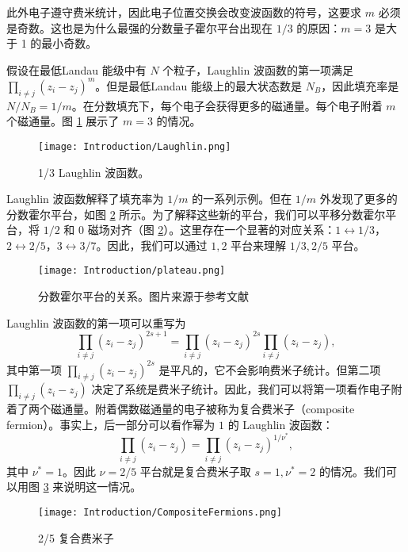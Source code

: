 此外电子遵守费米统计，因此电子位置交换会改变波函数的符号，这要求 $m$ 必须是奇数。这也是为什么最强的分数量子霍尔平台出现在 $1/3$ 的原因：$m=3$ 是大于 1 的最小奇数。

假设在最低Landau 能级中有 $N$ 个粒子，Laughlin 波函数的第一项满足 $\prod_{i \neq j}\left(z_i-z_j\right)^m$。但是最低Landau 能级上的最大状态数是 $N_B$，因此填充率是 $N/N_B=1/m$。在分数填充下，每个电子会获得更多的磁通量。每个电子附着 $m$ 个磁通量。图 \ref{fig:Laughlin} 展示了 $m=3$ 的情况。

\begin{figure}[htbp]
    \centering
    \texttt{[image: Introduction/Laughlin.png]}
    \caption{1/3 Laughlin 波函数。}
    \label{fig:Laughlin}
\end{figure}

Laughlin 波函数解释了填充率为 $1/m$ 的一系列示例。但在 $1/m$ 外发现了更多的分数霍尔平台，如图 \ref{fig:plateau} 所示。为了解释这些新的平台，我们可以平移分数霍尔平台，将 $1/2$ 和 $0$ 磁场对齐（图 \ref{fig:plateau}）。这里存在一个显著的对应关系：$1\leftrightarrow1/3$，$2\leftrightarrow2/5$，$3\leftrightarrow3/7$。因此，我们可以通过 $1, 2$ 平台来理解 $1/3, 2/5$ 平台。

\begin{figure}[htbp]
    \centering
    \texttt{[image: Introduction/plateau.png]}
    \caption{分数霍尔平台的关系。图片来源于参考文献\cite{Introduction/jain2014note}}
    \label{fig:plateau}
\end{figure}

Laughlin 波函数的第一项可以重写为
\begin{equation}
    \prod_{i \neq j}\left(z_i-z_j\right)^{2s+1} = \prod_{i \neq j}\left(z_i-z_j\right)^{2s} \prod_{i \neq j}\left(z_i-z_j\right),
\end{equation}
其中第一项 $\prod_{i \neq j}\left(z_i-z_j\right)^{2s}$ 是平凡的，它不会影响费米子统计。但第二项 $\prod_{i \neq j}\left(z_i-z_j\right)$ 决定了系统是费米子统计。因此，我们可以将第一项看作电子附着了两个磁通量。附着偶数磁通量的电子被称为复合费米子（composite fermion）\cite{jain1989composite}。事实上，后一部分可以看作幂为 $1$ 的 Laughlin 波函数：
\begin{equation}
    \prod_{i \neq j}\left(z_i-z_j\right) = \prod_{i \neq j}\left(z_i-z_j\right)^{1/\nu^*},
\end{equation}
其中 $\nu^*=1$。因此 $\nu=2/5$ 平台就是复合费米子取 $s=1, \nu^*=2$ 的情况。我们可以用图 \ref{fig:CF} 来说明这一情况。
\begin{figure}[htbp]
    \centering
    \texttt{[image: Introduction/CompositeFermions.png]}
    \caption{2/5 复合费米子}
    \label{fig:CF}
\end{figure}

